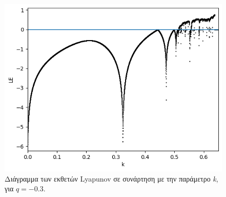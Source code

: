 \begin{figure}[ht]
	\centering
	\includegraphics[width=1\linewidth]{LateX images/graphs q03/g2}
	\caption{ Διάγραμμα των εκθετών Lyapunov σε συνάρτηση με την παράμετρο \emph{k}, για $q=-0.3$.}
	\label{f:g9}
\end{figure}

